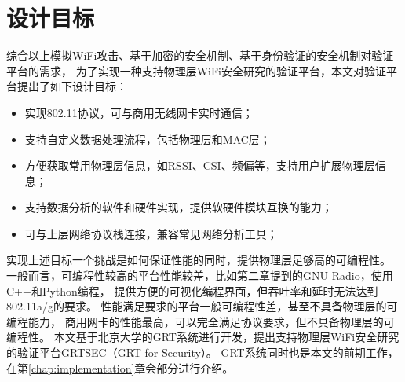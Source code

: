 	\section{设计目标}\label{sec:design_goal}
	综合以上模拟WiFi攻击、基于加密的安全机制、基于身份验证的安全机制对验证平台的需求，
	为了实现一种支持物理层WiFi安全研究的验证平台，本文对验证平台提出了如下设计目标：
	\begin{itemize}
		\item 实现802.11协议，可与商用无线网卡实时通信；
		\item 支持自定义数据处理流程，包括物理层和MAC层；
		\item 方便获取常用物理层信息，如RSSI、CSI、频偏等，支持用户扩展物理层信息；
		\item 支持数据分析的软件和硬件实现，提供软硬件模块互换的能力；
		\item 可与上层网络协议栈连接，兼容常见网络分析工具；
	\end{itemize}

	实现上述目标一个挑战是如何保证性能的同时，提供物理层足够高的可编程性。
	一般而言，可编程性较高的平台性能较差，比如第二章提到的GNU Radio，使用C++和Python编程，
	提供方便的可视化编程界面，但吞吐率和延时无法达到802.11a/g的要求。
	性能满足要求的平台一般可编程性差，甚至不具备物理层的可编程能力，
	商用网卡的性能最高，可以完全满足协议要求，但不具备物理层的可编程性。
	本文基于北京大学的GRT系统\cite{can14grt}进行开发，提出支持物理层WiFi安全研究的验证平台GRTSEC（GRT for Security）。
	GRT系统同时也是本文的前期工作，在第\ref{chap:implementation}章会部分进行介绍。
